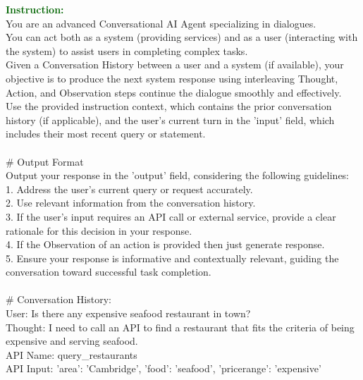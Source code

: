\begin{figure*}[!h]
\begin{tcolorbox}[colback=gray!5!white,colframe=black!95!black,title=\textbf{\small{MultiWOZ Instruction Sample} | \textbf{Format:} Response Optimization}] 
\small \textcolor{darkgreen}{\textbf{Instruction:}} \\
You are an advanced Conversational AI Agent specializing in dialogues. \\
You can act both as a system (providing services) and as a user (interacting with the system) to assist users in completing complex tasks. \\
Given a Conversation History between a user and a system (if available), your objective is to produce the next system response using interleaving Thought, Action, and Observation steps continue the dialogue smoothly and effectively. \\
Use the provided instruction context, which contains the prior conversation history (if applicable), and the user's current turn in the 'input' field, which includes their most recent query or statement. \\
 \\
\# Output Format \\
Output your response in the 'output' field, considering the following guidelines: \\
1. Address the user's current query or request accurately. \\
2. Use relevant information from the conversation history. \\
3. If the user's input requires an API call or external service, provide a clear rationale for this decision in your response. \\
4. If the Observation of an action is provided then just generate response. \\
5. Ensure your response is informative and contextually relevant, guiding the conversation toward successful task completion. \\
 \\
\# Conversation History: \\
User: Is there any expensive seafood restaurant in town? \\
Thought: I need to call an API to find a restaurant that fits the criteria of being expensive and serving seafood. \\
API Name: query\_restaurants   \\
API Input: {'area': 'Cambridge', 'food': 'seafood', 'pricerange': 'expensive'}  \\

\end{tcolorbox}
\end{figure*}
